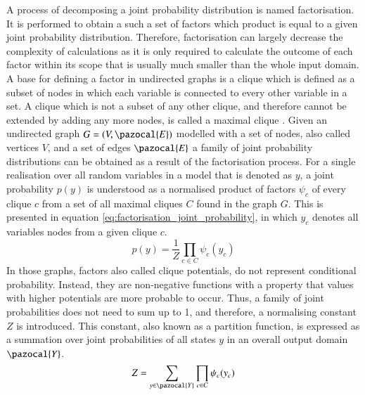 A process of decomposing a joint probability distribution is named factorisation. It is performed to obtain a such a set of factors which product is equal to a given joint probability distribution. Therefore, factorisation can largely decrease the complexity of calculations as it is only required to calculate the outcome of each factor within its scope that is usually much smaller than the whole input domain. A base for defining a factor in undirected graphs is a clique which is defined as a subset of nodes in which each variable is connected to every other variable in a set. A clique which is not a subset of any other clique, and therefore cannot be extended by adding any more nodes, is called a maximal clique \cite{clique}. Given an undirected graph $G=(V,\pazocal{E})$ modelled with a set of nodes, also called vertices $V$, and a set of edges $\pazocal{E}$ a family of joint probability distributions can be obtained as a result of the factorisation process. For a single realisation over all random variables in a model that is denoted as $y$, a joint probability $p(y)$ is understood as a normalised product of factors $\psi_{c}$ of every clique $c$ from a set of all maximal cliques $C$ found in the graph $G$. This is presented in equation \ref{eq:factorisation_joint_probability}, in which $y_c$ denotes all variables nodes from a given clique $c$.
\begin{equation}
    \label{eq:factorisation_joint_probability}
    p(y)=\frac{1}{Z}\prod_{c\in C}\psi_{c}({y_c})
\end{equation}
In those graphs, factors also called clique potentials, do not represent conditional probability. Instead, they are non-negative functions with a property that values with higher potentials are more probable to occur. Thus, a family of joint probabilities does not need to sum up to 1, and therefore, a normalising constant $Z$ is introduced. This constant, also known as a partition function, is expressed as a summation over joint probabilities of all states $y$ in an overall output domain $\pazocal{Y}$.
\begin{equation}
    Z=\sum_{y\in \pazocal{Y}}\prod_{c\in C}\psi_{c}({y_c}) 
\end{equation}

